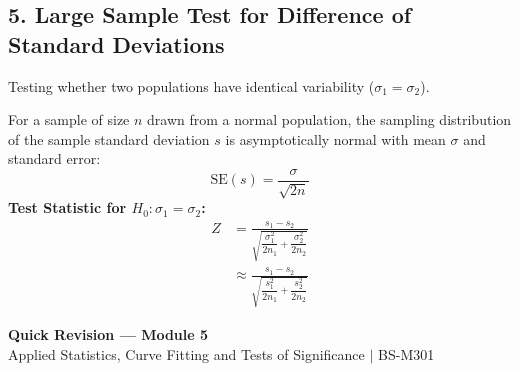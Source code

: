 \documentclass[12pt,a4paper]{article}
\begin{document}
\subsection{5. Large Sample Test for Difference of Standard Deviations}
Testing whether two populations have identical variability ($\sigma_1 = \sigma_2$).
\begin{tcolorbox}[formulabox, title={\textbf{Test for Difference of Two Standard Deviations}}]
For a sample of size $n$ drawn from a normal population, the sampling distribution of the sample standard deviation $s$ is asymptotically normal with mean $\sigma$ and standard error:
\begin{equation}
  \text{SE}(s) = \frac{\sigma}{\sqrt{2n}}
\end{equation}
\textbf{Test Statistic for $H_0: \sigma_1 = \sigma_2$:}
\begin{equation}
  \begin{aligned}
    Z &= \frac{s_1 - s_2}{\sqrt{\dfrac{\sigma_1^2}{2n_1} + \dfrac{\sigma_2^2}{2n_2}}} \\[3pt]
    &\approx \frac{s_1 - s_2}{\sqrt{\dfrac{s_1^2}{2n_1} + \dfrac{s_2^2}{2n_2}}}
  \end{aligned}
\end{equation}
\end{tcolorbox}

\newpage
\begin{center}
  {\large\bfseries\color{myred} Quick Revision --- Module 5}\\[3pt]
  {\small\color{mydark} Applied Statistics, Curve Fitting and Tests of Significance $|$ BS-M301}
\end{center}
\noindent{\color{myred}\rule{\linewidth}{1.2pt}}
\vspace{1pt}
\end{document}
